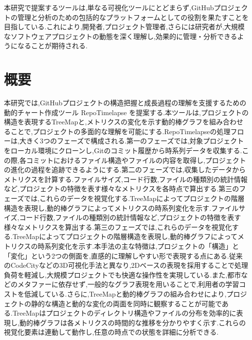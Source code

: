 \documentclass[12pt,twoside]{jbook}
\begin{document}
本研究で提案するツールは,単なる可視化ツールにとどまらず,GitHubプロジェクトの管理と分析のための包括的なプラットフォームとしての役割を果たすことを目指している.これにより,開発者,プロジェクト管理者,さらには研究者が,大規模なソフトウェアプロジェクトの動態を深く理解し,効果的に管理・分析できるようになることが期待される.

\section{概要}
本研究では,GitHubプロジェクトの構造把握と成長過程の理解を支援するための動的チャート作成ツール RepoTimelapse を提案する.本ツールは,プロジェクトの構造を表現するTreeMapと,メトリクスの変化を示す動的棒グラフを組み合わせることで,プロジェクトの多面的な理解を可能にする.RepoTimelapseの処理フローは,大きく3つのフェーズで構成される.第一のフェーズでは,対象プロジェクトをローカル環境にクローンし,Gitのコミット履歴から時系列データを収集する.この際,各コミットにおけるファイル構造やファイルの内容を取得し,プロジェクトの進化の過程を追跡できるようにする.第二のフェーズでは,収集したデータからメトリクスを計算する.ファイルサイズ,コード行数,ファイルの種類別の統計情報など,プロジェクトの特徴を表す様々なメトリクスを各時点で算出する.第三のフェーズでは,これらのデータを視覚化する.TreeMapによってプロジェクトの階層構造を表現し,動的棒グラフによってメトリクスの時系列変化を示す.ファイルサイズ,コード行数,ファイルの種類別の統計情報など,プロジェクトの特徴を表す様々なメトリクスを算出する.第三のフェーズでは,これらのデータを視覚化する.TreeMapによってプロジェクトの階層構造を表現し,動的棒グラフによってメトリクスの時系列変化を示す.本手法の主な特徴は,プロジェクトの「構造」と「変化」という2つの側面を,直感的に理解しやすい形で表現する点にある.従来のCodeCityなどの3D可視化手法と異なり,2Dベースの表現を採用することで処理負荷を軽減し,大規模プロジェクトでも快適な操作性を実現している.また,都市などのメタファーに依存せず,一般的なグラフ表現を用いることで,利用者の学習コストを低減している.さらに,TreeMapと動的棒グラフの組み合わせにより,プロジェクトの静的な構造と動的な変化の両面を同時に観察することが可能である.TreeMapはプロジェクトのディレクトリ構造やファイルの分布を効率的に表現し,動的棒グラフは各メトリクスの時間的な推移を分かりやすく示す.これらの視覚化要素は連動して動作し,任意の時点での状態を詳細に分析できる.
\end{document}
